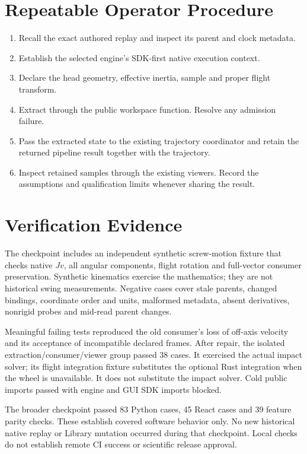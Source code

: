 \documentclass[11pt]{article}
\begin{document}
\section*{Repeatable Operator Procedure}
\begin{enumerate}
\item Recall the exact authored replay and inspect its parent and clock metadata.
\item Establish the selected engine's SDK-first native execution context.
\item Declare the head geometry, effective inertia, sample and proper flight transform.
\item Extract through the public workspace function. Resolve any admission failure.
\item Pass the extracted state to the existing trajectory coordinator and retain
the returned pipeline result together with the trajectory.
\item Inspect retained samples through the existing viewers. Record the assumptions
and qualification limits whenever sharing the result.
\end{enumerate}

\newpage
\section*{Verification Evidence}
The checkpoint includes an independent synthetic screw-motion fixture that
checks native $Jv$, all angular components, flight rotation and full-vector
consumer preservation. Synthetic kinematics exercise the mathematics; they
are not historical swing measurements. Negative cases cover stale parents,
changed bindings, coordinate order and units, malformed metadata, absent
derivatives, nonrigid probes and mid-read parent changes.

Meaningful failing tests reproduced the old consumer's loss of off-axis
velocity and its acceptance of incompatible declared frames. After repair,
the isolated extraction/consumer/viewer group passed 38 cases. It exercised the
actual impact solver; its flight integration fixture substitutes the optional
Rust integration when the wheel is unavailable. It does not substitute the
impact solver. Cold public imports passed with engine and GUI SDK imports blocked.

The broader checkpoint passed 83 Python cases, 45 React cases and 39 feature
parity checks. These establish covered software behavior only. No new historical
native replay or Library mutation occurred during that checkpoint. Local checks
do not establish remote CI success or scientific release approval.
\end{document}
